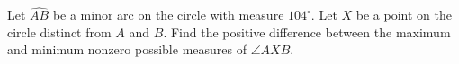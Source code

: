 Let $\widehat{AB}$ be a minor arc on the circle with measure $104^{\circ}$. Let $X$ be a point on the circle distinct from $A$ and $B$. Find the positive difference between the maximum and minimum nonzero possible measures of $\angle AXB$.
